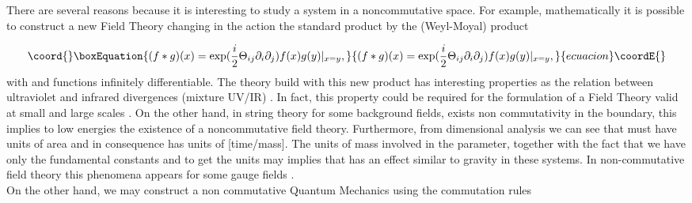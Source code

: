 \documentclass[a4paper,12pt]{article}
\begin{document}
There are several reasons because it is interesting to study a
system in a noncommutative space. For example, mathematically it
is possible to construct a new Field Theory changing in the action
the standard product by the (Weyl-Moyal) product

\begin{equation}\coord{}\boxEquation{
(f*g)(x)=\exp (\frac{i}{2}\Theta_{ij}\partial_{i}\partial_{j})f(x)g(y)|_{x=y},
}{
(f*g)(x)=\exp (\frac{i}{2}\Theta_{ij}\partial_{i}\partial_{j})f(x)g(y)|_{x=y},
}{ecuacion}\coordE{}\end{equation}
with \coordHE{} and \coordHE{} functions infinitely differentiable. The theory
build with this new product has interesting properties as the
relation between ultraviolet and infrared divergences (mixture
UV/IR) \cite{minwalla:gnus}. In fact, this property could be
required for the formulation of a Field Theory valid at small and
large scales \cite{cohen:gnus}. On the other hand, in string
theory for some background fields, exists non commutativity in the
boundary, this implies to low energies the existence of a
noncommutative field theory. Furthermore, from dimensional
analysis we can see that \coordHE{} must have units of
area and in consequence \coordHE{}  has units of [time/mass].
The units of mass involved in the \coordHE{} parameter,
together with the fact that we have only the fundamental constants
\coordHE{} and \coordHE{} to get the units may implies that \coordHE{} has an
effect similar to gravity in these systems. In non-commutative
field theory this phenomena appears for some gauge
fields \cite{rivelles:gnus}.\\

On the other hand, we may construct a non commutative Quantum
Mechanics using the commutation rules
\end{document}
